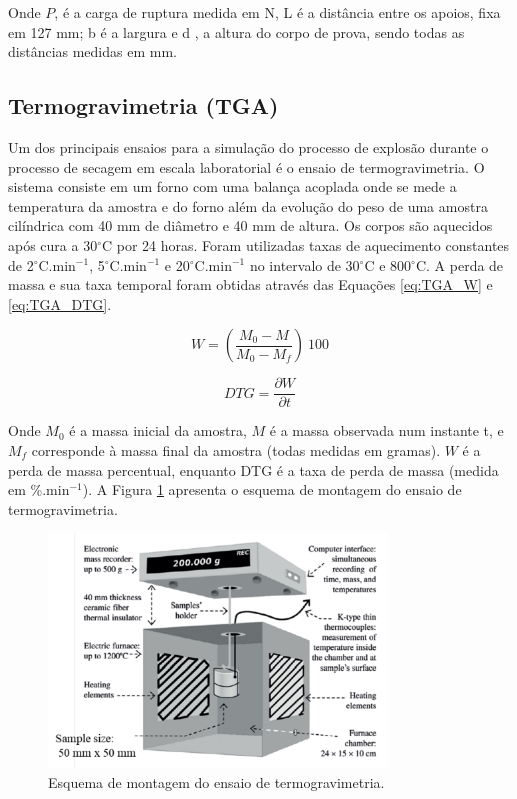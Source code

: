     Onde $P$, é a carga de ruptura medida em N, L é a distância  entre os
    apoios, fixa em 127 mm; b é a largura e d , a altura do corpo de prova,
    sendo todas as distâncias medidas em mm.
    
    \subsection{Termogravimetria (TGA)}\label{mat:TGA}
    
    Um dos principais ensaios para a simulação do processo de explosão durante o
    processo de secagem em escala laboratorial é o ensaio de termogravimetria. O
    sistema consiste em um forno com uma balança acoplada onde se mede a
    temperatura da amostra e do forno além da evolução do peso de uma amostra
    cilíndrica com 40 mm de diâmetro e 40 mm de altura. Os corpos são aquecidos
    após cura a 30$^\circ$C por 24 horas. Foram utilizadas taxas de aquecimento
    constantes de 2$^\circ$C.min$^{-1}$, 5$^\circ$C.min$^{-1}$ e
    20$^\circ$C.min$^{-1}$ no intervalo de 30$^\circ$C e 800$^\circ$C. A perda
    de massa e sua taxa temporal foram obtidas através das Equações
    \ref{eq:TGA_W} e \ref{eq:TGA_DTG}.

    \begin{equation}
      \label{eq:TGA_W}
      W = \left( \frac{M_0-M}{M_0-M_f} \right) \ 100
    \end{equation}

    \begin{equation}
      \label{eq:TGA_DTG}
      DTG = \frac{\partial W}{\partial t}
    \end{equation}

    Onde $M_0$ é a massa inicial da amostra, $M$ é a massa observada num
instante t, e $M_f$ corresponde à massa final da amostra (todas medidas em
gramas). $W$ é a perda de massa percentual, enquanto DTG é a taxa de perda de
massa (medida em \%.min$^{-1}$). A Figura \ref{fig:TGA} apresenta o esquema de
montagem do ensaio de termogravimetria.
    
 \begin{figure}[ht]
	\centering
	\includegraphics[width=9cm]{./figures/TGA.pdf}
	\caption{Esquema de montagem do ensaio de termogravimetria.  \label{fig:TGA}}
  \end{figure}



